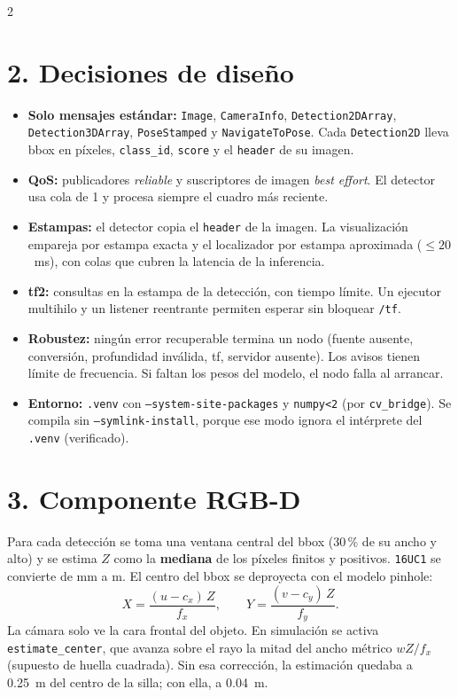 \documentclass[9pt,letterpaper]{extarticle}
\newcommand{\code}[1]{\texttt{\small #1}}
\begin{document}
\begin{multicols}{2}
\section*{2. Decisiones de diseño}
\begin{itemize}
  \item \textbf{Solo mensajes estándar:} \code{Image}, \code{CameraInfo},
        \code{Detection2DArray}, \code{Detection3DArray}, \code{PoseStamped} y
        \code{NavigateToPose}. Cada \code{Detection2D} lleva bbox en píxeles, \code{class\_id},
        \code{score} y el \code{header} de su imagen.
  \item \textbf{QoS:} publicadores \emph{reliable} y suscriptores de imagen \emph{best effort}. El
        detector usa cola de 1 y procesa siempre el cuadro más reciente.
  \item \textbf{Estampas:} el detector copia el \code{header} de la imagen. La visualización
        empareja por estampa exacta y el localizador por estampa aproximada ($\le 20$~ms), con
        colas que cubren la latencia de la inferencia.
  \item \textbf{tf2:} consultas en la estampa de la detección, con tiempo límite. Un ejecutor
        multihilo y un listener reentrante permiten esperar sin bloquear \code{/tf}.
  \item \textbf{Robustez:} ningún error recuperable termina un nodo (fuente ausente,
        conversión, profundidad inválida, tf, servidor ausente). Los avisos tienen límite de
        frecuencia. Si faltan los pesos del modelo, el nodo falla al arrancar.
  \item \textbf{Entorno:} \code{.venv} con \code{--system-site-packages} y \code{numpy<2} (por
        \code{cv\_bridge}). Se compila sin \code{--symlink-install}, porque ese modo ignora el
        intérprete del \code{.venv} (verificado).
\end{itemize}

\section*{3. Componente RGB-D}
Para cada detección se toma una ventana central del bbox (30\,\% de su ancho y alto) y se estima
$Z$ como la \textbf{mediana} de los píxeles finitos y positivos. \code{16UC1} se convierte de mm a
m. El centro del bbox se deproyecta con el modelo pinhole:
\[
  X = \frac{(u-c_x)\,Z}{f_x},\qquad Y = \frac{(v-c_y)\,Z}{f_y}.
\]
La cámara solo ve la cara frontal del objeto. En simulación se activa \code{estimate\_center}, que
avanza sobre el rayo la mitad del ancho métrico $w Z/f_x$ (supuesto de huella cuadrada). Sin esa
corrección, la estimación quedaba a 0.25~m del centro de la silla; con ella, a 0.04~m.


\end{multicols}
\end{document}
